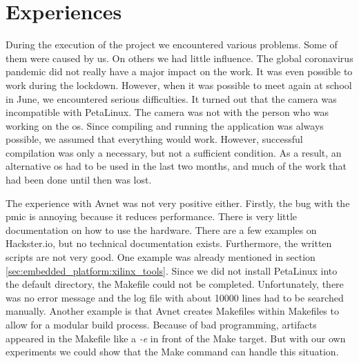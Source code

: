 \chapter*{Experiences}
\label{ch:experiences}

During the execution of the project we encountered various problems.
Some of them were caused by us.
On others we had little influence.
The global coronavirus pandemic did not really have a major impact on the work.
It was even possible to work during the lockdown.
However, when it was possible to meet again at school in June, we encountered serious difficulties.
It turned out that the camera was incompatible with PetaLinux.
The camera was not with the person who was working on the \acrlong{os}.
Since compiling and running the application was always possible, we assumed that everything would work.
However, successful compilation was only a necessary, but not a sufficient condition.
As a result, an alternative \acrlong{os} had to be used in the last two months, and much of the work that had been done until then was lost. 

The experience with Avnet was not very positive either.
Firstly, the bug with the \acrshort{pmic} is annoying because it reduces performance.
There is very little documentation on how to use the hardware.
There are a few examples on Hackster.io, but no technical documentation exists.
Furthermore, the written scripts are not very good.
One example was already mentioned in section \ref{sec:embedded_platform:xilinx_tools}.
Since we did not install PetaLinux into the default directory, the Makefile could not be completed.
Unfortunately, there was no error message and the log file with about \num{10000} lines had to be searched manually.
Another example is that Avnet creates Makefiles within Makefiles to allow for a modular build process.
Because of bad programming, artifacts appeared in the Makefile like a \textit{-e} in front of the Make target.
But with our own experiments we could show that the Make command can handle this situation.

